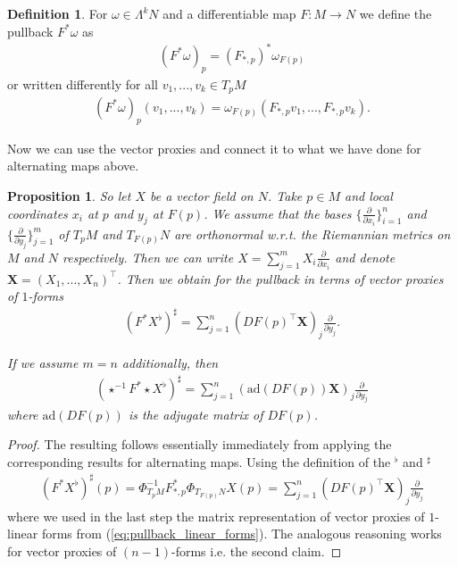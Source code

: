 \documentclass[12pt,a4paper]{article}
\numberwithin{equation}{subsection}
\numberwithin{lemma}{subsection}
\newtheorem{proposition}[lemma]{Proposition}
\theoremstyle{definition}
\newtheorem{definition}[lemma]{Definition}
\begin{document}
\begin{definition}
    For $\omega \in \Lambda^k N$ and a differentiable map $F:M \rightarrow N$ 
    we define the pullback $F^*\omega$ as
    \begin{align*}
        (F^*\omega)_p = (F_{*,p})^* \omega_{F(p)}
    \end{align*}
    or written differently for all $v_1,...,v_k \in T_p M$
    \begin{align*}
        (F^*\omega)_p (v_1,...,v_k) = \omega_{F(p)}(F_{*,p} v_1, ..., F_{*,p} v_k).
    \end{align*}
\end{definition}
Now we can use the vector proxies and connect it to what we have done 
for alternating maps above. 

\begin{proposition}
    So let $X$ be a vector field on $N$. Take $p \in M$ and local coordinates
    $x_i$ at $p$ and $y_j$ at $F(p)$. We assume that the bases
    $\{ \frac{\partial}{\partial x_i} \}_{i=1}^n$ and 
    $\{ \frac{\partial}{\partial y_j} \}_{j=1}^m$ of $T_p M$ and $T_{F(p)} N$ 
    are orthonormal w.r.t. the Riemannian metrics
    on $M$ and $N$ respectively. 
    Then we can write $X = \sum_{j=1}^m X_i \frac{\partial}{\partial x_i}$
    and denote $\mathbf{X} = (X_1,..., X_n)^\top$.
    Then we obtain for the pullback in terms of
    vector proxies of $1$-forms
    \begin{align*}
        (F^* X^\flat)^\sharp 
        = \sum_{j=1}^n (DF(p)^\top \mathbf{X})_j \frac{\partial}{\partial y_j}.
    \end{align*}

    If we assume $m=n$ additionally, then 
    \begin{align*}
        (\star^{-1} F^* \star X^\flat)^\sharp 
        = \sum_{j=1}^n (\text{ad}(DF(p)) \mathbf{X})_j \frac{\partial}{\partial y_j}
    \end{align*}
    where $\text{ad}(DF(p))$ is the adjugate matrix of $DF(p)$.
\end{proposition}
\begin{proof}
    The resulting follows essentially immediately from applying the 
    corresponding results for alternating maps. Using the definition of 
    the $^\flat$ and $^\sharp$
    \begin{align*}
        (F^* X^\flat)^\sharp(p)
        = \Phi^{-1}_{T_p M} F_{*,p}^* \Phi_{T_{F(p)}N} X(p)
        = \sum_{j=1}^n (DF(p)^\top \mathbf{X})_j \frac{\partial}{\partial y_j}
    \end{align*}
    where we used in the last step the matrix representation of vector proxies 
    of $1$-linear forms from (\ref{eq:pullback_linear_forms}). The analogous reasoning works 
    for vector proxies of $(n-1)$-forms i.e. the second claim.
\end{proof}
\end{document}
